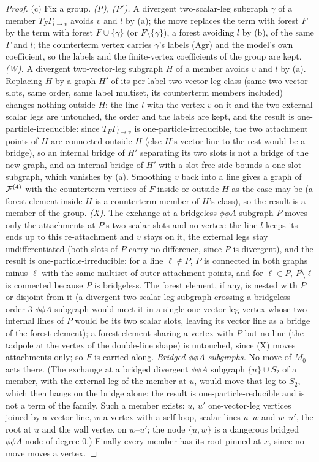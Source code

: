 \begin{proof}
(c) Fix a group. \emph{(P), (P$'$).} A divergent two-scalar-leg subgraph $\gamma$ of a member $T_F\Gamma_{l\to v}$ avoids $v$ and $l$ by (a); the move replaces the term with forest $F$ by the term with forest $F\cup\{\gamma\}$ (or $F\setminus\{\gamma\}$), a forest avoiding $l$ by (b), of the same $\Gamma$ and $l$; the counterterm vertex carries $\gamma$'s labels (Agr) and the model's own coefficient, so the labels and the finite-vertex coefficients of the group are kept. \emph{(W).} A divergent two-vector-leg subgraph $H$ of a member avoids $v$ and $l$ by (a). Replacing $H$ by a graph $H'$ of its per-label two-vector-leg class (same two vector slots, same order, same label multiset, its counterterm members included) changes nothing outside $H$: the line $l$ with the vertex $v$ on it and the two external scalar legs are untouched, the order and the labels are kept, and the result is one-particle-irreducible: since $T_F\Gamma_{l\to v}$ is one-particle-irreducible, the two attachment points of $H$ are connected outside $H$ (else $H$'s vector line to the rest would be a bridge), so an internal bridge of $H'$ separating its two slots is not a bridge of the new graph, and an internal bridge of $H'$ with a slot-free side bounds a one-slot subgraph, which vanishes by (a). Smoothing $v$ back into a line gives a graph of $\mathcal F^{(4)}$ with the counterterm vertices of $F$ inside or outside $H$ as the case may be (a forest element inside $H$ is a counterterm member of $H$'s class), so the result is a member of the group. \emph{(X).} The exchange at a bridgeless $\phi\phi A$ subgraph $P$ moves only the attachments at $P$'s two scalar slots and no vertex: the line $l$ keeps its ends up to this re-attachment and $v$ stays on it, the external legs stay undifferentiated (both slots of $P$ carry no difference, since $P$ is divergent), and the result is one-particle-irreducible: for a line $\ell\notin P$, $P$ is connected in both graphs minus $\ell$ with the same multiset of outer attachment points, and for $\ell\in P$, $P\setminus\ell$ is connected because $P$ is bridgeless. The forest element, if any, is nested with $P$ or disjoint from it (a divergent two-scalar-leg subgraph crossing a bridgeless order-$3$ $\phi\phi A$ subgraph would meet it in a single one-vector-leg vertex whose two internal lines of $P$ would be its two scalar slots, leaving its vector line as a bridge of the forest element); a forest element sharing a vertex with $P$ but no line (the tadpole at the \cite[(1.6)]{Ba3} vertex of the double-line shape) is untouched, since \textup{(X)} moves attachments only; so $F$ is carried along. \emph{Bridged $\phi\phi A$ subgraphs.} No move of $M_0$ acts there. (The exchange at a bridged divergent $\phi\phi A$ subgraph $\{u\}\cup S_2$ of a member, with the external leg of the member at $u$, would move that leg to $S_2$, which then hangs on the bridge alone: the result is one-particle-reducible and is not a term of the family. Such a member exists: $u$, $u'$ one-vector-leg vertices \cite[(1.8)]{Ba3} joined by a vector line, $w$ a \cite[(1.6)]{Ba3} vertex with a self-loop, scalar lines $u$--$w$ and $w$--$u'$, the root at $u$ and the wall vertex on $w$--$u'$; the node $\{u,w\}$ is a dangerous bridged $\phi\phi A$ node of degree $0$.) Finally every member has its root pinned at $x$, since no move moves a vertex.

\end{proof}
